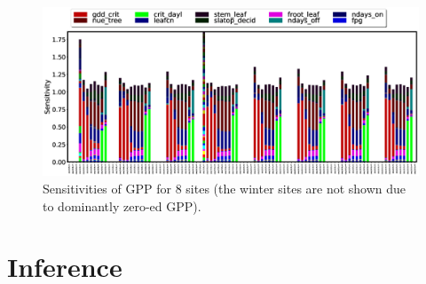 \documentclass[12pt]{article}
\begin{document}
\begin{figure}[!hb]
\includegraphics[width=\textwidth]{figs/sens.eps}
\caption{\label{fig:sens} Sensitivities of GPP for 8 sites (the winter sites are not shown due to dominantly zero-ed GPP). }
\end{figure}

\section{Inference}
\end{document}
